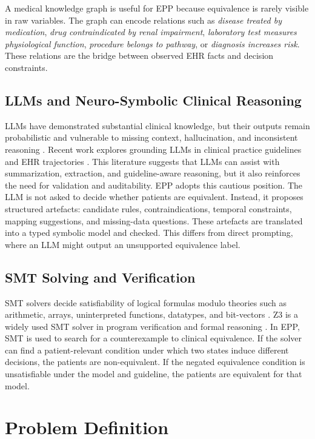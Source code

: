 \documentclass[english,5p,twocolumn,preprint]{elsarticle}
\begin{document}
A medical knowledge graph is useful for EPP because equivalence is rarely visible in raw variables. The graph can encode relations such as \emph{disease treated by medication}, \emph{drug contraindicated by renal impairment}, \emph{laboratory test measures physiological function}, \emph{procedure belongs to pathway}, or \emph{diagnosis increases risk}. These relations are the bridge between observed EHR facts and decision constraints.

\subsection{LLMs and Neuro-Symbolic Clinical Reasoning}
LLMs have demonstrated substantial clinical knowledge, but their outputs remain probabilistic and vulnerable to missing context, hallucination, and inconsistent reasoning \cite{singhal2023large,thirunavukarasu2023llm}. Recent work explores grounding LLMs in clinical practice guidelines and EHR trajectories \cite{oniani2024guidelines,li2025clicare}. This literature suggests that LLMs can assist with summarization, extraction, and guideline-aware reasoning, but it also reinforces the need for validation and auditability. EPP adopts this cautious position. The LLM is not asked to decide whether patients are equivalent. Instead, it proposes structured artefacts: candidate rules, contraindications, temporal constraints, mapping suggestions, and missing-data questions. These artefacts are translated into a typed symbolic model and checked. This differs from direct prompting, where an LLM might output an unsupported equivalence label.

\subsection{SMT Solving and Verification}
SMT solvers decide satisfiability of logical formulas modulo theories such as arithmetic, arrays, uninterpreted functions, datatypes, and bit-vectors \cite{barrett2009smt}. Z3 is a widely used SMT solver in program verification and formal reasoning \cite{moura2008z3}. In EPP, SMT is used to search for a counterexample to clinical equivalence. If the solver can find a patient-relevant condition under which two states induce different decisions, the patients are non-equivalent. If the negated equivalence condition is unsatisfiable under the model and guideline, the patients are equivalent for that model.

\section{Problem Definition}
\end{document}
